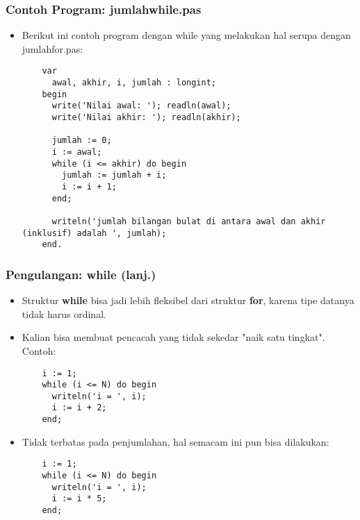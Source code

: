 \documentclass{beamer}
\begin{document}
\begin{frame}[fragile]
\frametitle{Contoh Program: jumlahwhile.pas}
\begin{itemize}
  \item Berikut ini contoh program dengan while yang melakukan hal serupa dengan jumlahfor.pas:
  \begin{lstlisting}
    var
      awal, akhir, i, jumlah : longint;
    begin
      write('Nilai awal: '); readln(awal);
      write('Nilai akhir: '); readln(akhir);

      jumlah := 0;
      i := awal;
      while (i <= akhir) do begin
        jumlah := jumlah + i;
        i := i + 1;
      end;

      writeln('jumlah bilangan bulat di antara awal dan akhir (inklusif) adalah ', jumlah);
    end.
  \end{lstlisting}
\end{itemize}
\end{frame}

\begin{frame}[fragile]
\frametitle{Pengulangan: while (lanj.)}
\begin{itemize}
  \item Struktur \textbf{while} bisa jadi lebih fleksibel dari struktur \textbf{for}, karena tipe datanya tidak harus ordinal.
  \item Kalian bisa membuat pencacah yang tidak sekedar "naik satu tingkat". Contoh:
  \begin{lstlisting}
    i := 1;
    while (i <= N) do begin
      writeln('i = ', i);
      i := i + 2;
    end;
  \end{lstlisting}

  \item Tidak terbatas pada penjumlahan, hal semacam ini pun bisa dilakukan:
  \begin{lstlisting}
    i := 1;
    while (i <= N) do begin
      writeln('i = ', i);
      i := i * 5;
    end;
  \end{lstlisting}
\end{itemize}
\end{frame}
\end{document}
